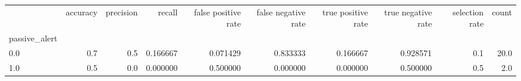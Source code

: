 \begin{tabular}{lrrrrrrrrr}
\toprule
{} &  accuracy &  precision &    recall &  false positive rate &  false negative rate &  true positive rate &  true negative rate &  selection rate &  count \\
passive\_alert &           &            &           &                      &                      &                     &                     &                 &        \\
\midrule
0.0           &       0.7 &        0.5 &  0.166667 &             0.071429 &             0.833333 &            0.166667 &            0.928571 &             0.1 &   20.0 \\
1.0           &       0.5 &        0.0 &  0.000000 &             0.500000 &             0.000000 &            0.000000 &            0.500000 &             0.5 &    2.0 \\
\bottomrule
\end{tabular}
